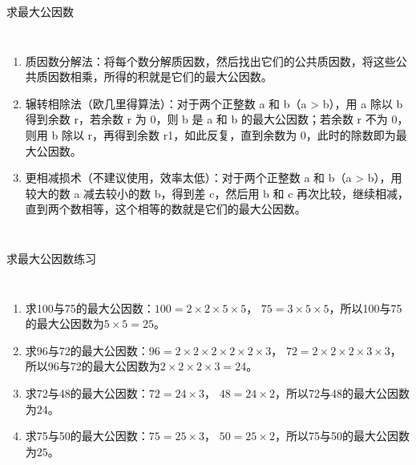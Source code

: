 \documentclass[aspectratio=169]{ctexbeamer} %
\begin{document}
\begin{frame}[t]{求最大公因数}
\begin{columns}
\begin{enumerate}[label={\arabic*.}]
\item \alert{质因数分解法：}将每个数分解质因数，然后找出它们的公共质因数，将这些公共质因数相乘，所得的积就是它们的最大公因数。
\item \alert{辗转相除法（欧几里得算法）：}对于两个正整数 a 和 b（a > b），用 a 除以 b 得到余数 r，若余数 r 为 0，则 b 是 a 和 b 的最大公因数；若余数 r 不为 0，则用 b 除以 r，再得到余数 r1，如此反复，直到余数为 0，此时的除数即为最大公因数。
\item \alert{更相减损术（不建议使用，效率太低）：}对于两个正整数 a 和 b（a > b），用较大的数 a 减去较小的数 b，得到差 c，然后用 b 和 c 再次比较，继续相减，直到两个数相等，这个相等的数就是它们的最大公因数。
\end{enumerate}
\end{columns}
\end{frame}

\begin{frame}[t]{求最大公因数练习}
\begin{columns}
\begin{enumerate}[label={\arabic*.}]
\item 求100与75的最大公因数：\pause $100 = 2 \times 2 \times 5 \times 5$， $75 = 3 \times 5 \times 5$，所以100与75的最大公因数为$5 \times 5 = 25$。
\item 求96与72的最大公因数：\pause $96 = 2 \times 2 \times 2 \times 2 \times 2 \times 3$， $72 = 2 \times 2 \times 2 \times 3 \times 3$，所以96与72的最大公因数为$2 \times 2 \times 2 \times 3  = 24$。
\item 求72与48的最大公因数：\pause $72 = 24 \times 3$， $48 = 24 \times 2$，所以72与48的最大公因数为$24$。
\item 求75与50的最大公因数：\pause $75 = 25 \times 3$， $50 = 25 \times 2$，所以75与50的最大公因数为$25$。
\end{enumerate}
\end{columns}
\end{frame}
\end{document}

